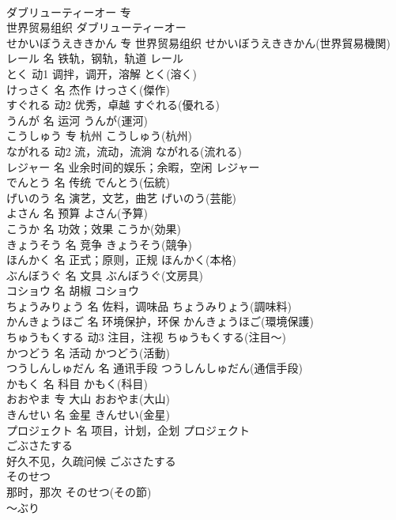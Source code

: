 \documentclass[8pt]{extreport}
\begin{document}
\begin{CJK}{UTF8}{min}
\\	ダブリューティーオー	专	
\\	世界贸易组织	ダブリューティーオー
\\	せかいぼうえききかん	专	世界贸易组织	せかいぼうえききかん(世界貿易機関)	
\\	レール	名	铁轨，钢轨，轨道	レール	
\\	とく	动1	调拌，调开，溶解	とく(溶く)	
\\	けっさく	名	杰作	けっさく(傑作)	
\\	すぐれる	动2	优秀，卓越	すぐれる(優れる)	
\\	うんが	名	运河	うんが(運河)	
\\	こうしゅう	专	杭州	こうしゅう(杭州)	
\\	ながれる	动2	流，流动，流淌	ながれる(流れる)	
\\	レジャー	名	业余时间的娱乐；余暇，空闲	レジャー	
\\	でんとう	名	传统	でんとう(伝統)	
\\	げいのう	名	演艺，文艺，曲艺	げいのう(芸能)	
\\	よさん	名	预算	よさん(予算)	
\\	こうか	名	功效；效果	こうか(効果)	
\\	きょうそう	名	竞争	きょうそう(競争)	
\\	ほんかく	名	正式；原则，正规	ほんかく(本格)	
\\	ぶんぼうぐ	名	文具	ぶんぼうぐ(文房具)	
\\	コショウ	名	胡椒	コショウ	
\\	ちょうみりょう	名	佐料，调味品	ちょうみりょう(調味料)	
\\	かんきょうほご	名	环境保护，环保	かんきょうほご(環境保護)	
\\	ちゅうもくする	动3	注目，注视	ちゅうもくする(注目～)	
\\	かつどう	名	活动	かつどう(活動)	
\\	つうしんしゅだん	名	通讯手段	つうしんしゅだん(通信手段)	
\\	かもく	名	科目	かもく(科目)	
\\	おおやま	专	大山	おおやま(大山)	
\\	きんせい	名	金星	きんせい(金星)	
\\	プロジェクト	名	项目，计划，企划	プロジェクト	
\\	ごぶさたする	
\\	好久不见，久疏问候	ごぶさたする	
\\	そのせつ	
\\	那时，那次	そのせつ(その節)	
\\	～ぶり	

\end{CJK}
\end{document}
